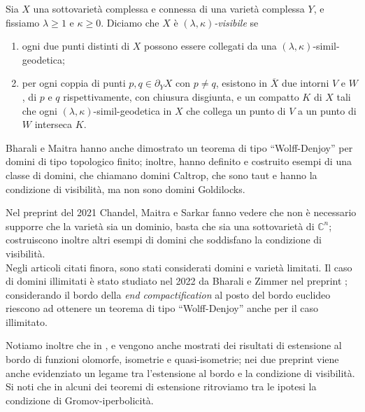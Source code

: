 \begin{defn*}
    Sia $X$ una sottovarietà complessa e connessa di una varietà complessa $Y$, e fissiamo $\lambda \ge 1$ e $\kappa \ge 0$. Diciamo che $X$ è \textit{$(\lambda,\kappa)$-visibile} se
    \begin{enumerate}
        \item ogni due punti distinti di $X$ possono essere collegati da una $(\lambda,\kappa)$-simil-geodetica;
        \item per ogni coppia di punti $p,q\in\partial_YX$ con $p\not=q$, esistono in $\overline{X}$ due intorni $V$ e $W$, di $p$ e $q$ rispettivamente, con chiusura disgiunta, e un compatto $K$ di $X$ tali che  ogni $(\lambda,\kappa)$-simil-geodetica in $X$ che collega un punto di $V$ a un punto di $W$ interseca $K$.
    \end{enumerate}
\end{defn*}

Bharali e Maitra hanno anche dimostrato un teorema di tipo ``Wolff-Denjoy'' per domini di tipo topologico finito; inoltre, hanno definito e costruito esempi di una classe di domini, che chiamano domini Caltrop, che sono taut e hanno la condizione di visibilità, ma non sono domini Goldilocks.

Nel preprint \cite{CMS} del 2021 Chandel, Maitra e Sarkar fanno vedere che non è necessario supporre che la varietà sia un dominio, basta che sia una sottovarietà di $\mathbb{C}^n$; costruiscono inoltre altri esempi di domini che soddisfano la condizione di visibilità.\\

Negli articoli citati finora, sono stati considerati domini e varietà limitati. Il caso di domini illimitati è stato studiato nel 2022 da Bharali e Zimmer nel preprint \cite{BZ2}; considerando il bordo della \textit{end compactification} al posto del bordo euclideo riescono ad ottenere un teorema di tipo ``Wolff-Denjoy'' anche per il caso illimitato.

Notiamo inoltre che in \cite{BZ1}, \cite{CMS} e \cite{BZ2} vengono anche mostrati dei risultati di estensione al bordo di funzioni olomorfe, isometrie e quasi-isometrie; nei due preprint viene anche evidenziato un legame tra l'estensione al bordo e la condizione di visibilità. Si noti che in alcuni dei teoremi di estensione ritroviamo tra le ipotesi la condizione di Gromov-iperbolicità. \\

